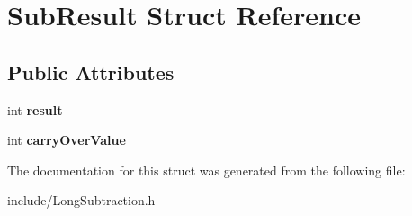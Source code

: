 \section{Sub\+Result Struct Reference}
\label{struct_sub_result}
\subsection*{Public Attributes}
\begin{DoxyCompactItemize}
\item 
\mbox{\label{struct_sub_result_aa9410a50f7fa1046637c348a8be7d605}} 
int {\bfseries result}
\item 
\mbox{\label{struct_sub_result_a685d51c6ae8df3edf9a74bc84ecc85a0}} 
int {\bfseries carry\+Over\+Value}
\end{DoxyCompactItemize}


The documentation for this struct was generated from the following file\+:\begin{DoxyCompactItemize}
\item 
include/Long\+Subtraction.\+h\end{DoxyCompactItemize}
